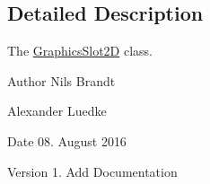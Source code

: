\subsection{Detailed Description}
The \hyperlink{classGraphicsSlot2D}{Graphics\-Slot2\-D} class. 

\begin{DoxyAuthor}{Author}
Nils Brandt 

Alexander Luedke
\end{DoxyAuthor}
\begin{DoxyDate}{Date}
08. August 2016
\end{DoxyDate}
\begin{DoxyVersion}{Version}
1. Add Documentation 
\end{DoxyVersion}
